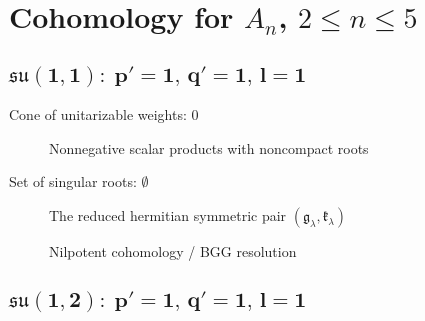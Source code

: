 \section[Cohomology of unitarizable modules for An, 1 < n < 6]{Cohomology for $A_n$, $2 \leq n \leq 5$}

\subsection[su(1,1): 1,1,1]{$\boldsymbol{\mathfrak{su}(1, 1)\!:\; p'= 1,\, q' = 1,\, l = 1}$}

Cone of unitarizable weights: $0$ \\


\begin{figure}[H]
  \centering
  \caption{Nonnegative scalar products with noncompact roots}
\end{figure}

\noindent Set of singular roots: $\emptyset$ \\

\begin{figure}[H]
  \centering
  \caption{The reduced hermitian symmetric pair $(\mathfrak{g}_\lambda, \mathfrak{k}_\lambda)$}
\end{figure}

\begin{figure}[H]
  \centering
  \caption{Nilpotent cohomology / BGG resolution}
\end{figure}

        


\subsection[su(1,2): 1,1,1]{$\boldsymbol{\mathfrak{su}(1, 2)\!:\; p'= 1,\, q' = 1,\, l = 1}$}

